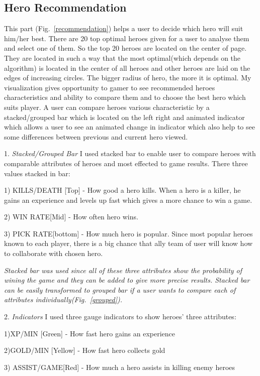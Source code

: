\documentclass[twocolumn]{autart}    %
\begin{document}
\subsection{Hero Recommendation}
This part (Fig.~\ref{recommendation}) helps a user to decide which hero will suit him/her best. There are 20 top optimal heroes given for a user to analyse them and select one of them. So the top 20 heroes are located on the center of page. They are located in such a way that the most optimal(which depends on the algorithm) is located in the center of all heroes and other heroes are laid on the edges of increasing circles. The bigger radius of hero, the more it is optimal. My visualization gives opportunity to gamer to see recommended heroes characteristics and ability to compare them and to choose the best hero which suits player. A user can compare heroes various characteristic by a stacked/grouped bar which is located on the left right  and animated indicator which allows a user to see an animated change in indicator which also help to see some differences between previous and current hero viewed. 


	1. \emph{Stacked/Grouped Bar} I used stacked bar to enable user to compare heroes with  comparable attributes of heroes and most effected to game results. There three values stacked in bar: 

		1) KILLS/DEATH [Top] - How good a hero kills. When a hero is a killer, he gains an experience and levels up fast which gives a more chance to win a game.
		
		2) WIN RATE[Mid] - How often hero wins. 

		3) PICK RATE[bottom] - How much hero is popular. Since most popular heroes known to each player, there is a big chance that ally team of user will know how to collaborate with chosen hero.

\emph{Stacked bar was used since all of these three attributes show the probability of wining the game and they can be added to give more precise results. Stacked bar can be easily transformed to grouped bar if a user wants to compare each of attributes individually(Fig.~\ref{grouped}).}


	2. \emph{Indicators} I used three gauge indicators to show heroes' three attributes:
			
		1)XP/MIN [Green] - How fast hero gains an experience
		
		2)GOLD/MIN [Yellow] - How fast hero collects gold
		
		3) ASSIST/GAME[Red] - How much a hero assists in killing enemy heroes 
\end{document}
